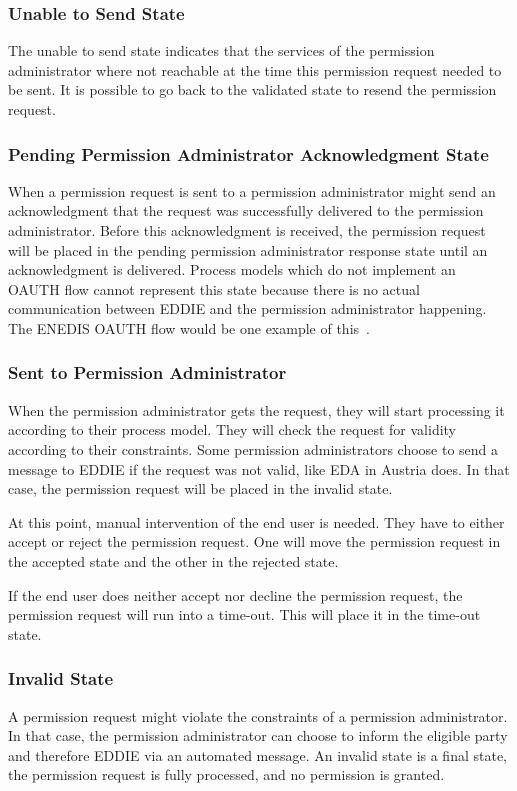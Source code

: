 \subsubsection{Unable to Send State}
The unable to send state indicates that the services of the permission administrator where not reachable at the time this permission request needed to be sent.
It is possible to go back to the validated state to resend the permission request.

\subsubsection{Pending Permission Administrator Acknowledgment State}
When a permission request is sent to a permission administrator might send an acknowledgment that the request was successfully delivered to the permission administrator.
Before this acknowledgment is received, the permission request will be placed in the pending permission administrator response state until an acknowledgment is delivered.
Process models which do not implement an OAUTH flow cannot represent this state because there is no actual communication between EDDIE and the permission administrator happening.
The ENEDIS OAUTH flow would be one example of this~\cite{enedis-dev-guide}.

\subsubsection{Sent to Permission Administrator}
When the permission administrator gets the request, they will start processing it according to their process model.
They will check the request for validity according to their constraints.
Some permission administrators choose to send a message to EDDIE if the request was not valid, like EDA in Austria does.
In that case, the permission request will be placed in the invalid state.

At this point, manual intervention of the end user is needed.
They have to either accept or reject the permission request.
One will move the permission request in the accepted state and the other in the rejected state.

If the end user does neither accept nor decline the permission request, the permission request will run into a time-out.
This will place it in the time-out state.

\subsubsection{Invalid State}
A permission request might violate the constraints of a permission administrator.
In that case, the permission administrator can choose to inform the eligible party and therefore EDDIE via an automated message.
An invalid state is a final state, the permission request is fully processed, and no permission is granted.

